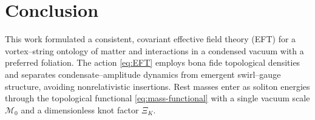 \documentclass[preprint,titlepage]{revtex4-2}
\begin{document}
    

    

    

    

    

    

    \section{Conclusion}

    This work formulated a consistent, covariant effective field theory (EFT) for a vortex–string ontology of matter and interactions in a condensed vacuum with a preferred foliation. The action \eqref{eq:EFT} employs bona fide topological densities and separates condensate–amplitude dynamics from emergent swirl–gauge structure, avoiding nonrelativistic insertions. Rest masses enter as soliton energies through the topological functional \eqref{eq:mass-functional} with a single vacuum scale \(\mathcal{M}_0\) and a dimensionless knot factor \(\Xi_K\).
\end{document}
